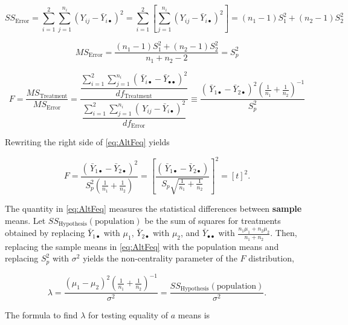 \documentclass[
]{article}
\begin{document}
\begin{equation}
SS_\text{Error} = \sum_{i=1}^{2}\sum_{j=1}^{n_i}(Y_{ij} - \bar{Y}_{i\bullet})^2 = \sum_{i=1}^{2}\left[\sum_{j=1}^{n_i}(Y_{ij}- \bar{Y}_{i\bullet})^2\right] = (n_1 - 1)S_1^2 + (n_2 - 1)S_2^2
\label{eq:FE}
\end{equation}

\begin{equation}
MS_\text{Error} = \frac{(n_1 - 1)S_1^2 + (n_2 - 1)S_2^2}{n_1 + n_2 -2} = S_p^2
\label{eq:MFE}
\end{equation}

\begin{equation}
F = \frac{MS_\text{Treatment}}{MS_\text{Error}} = \dfrac{\dfrac{\sum_{i=1}^2 \sum_{j=1}^{n_i} (\,\bar{Y}_{i\bullet} - \bar{Y}_{\bullet\bullet})^2}{df_\text{Treatment}}}{\dfrac{\sum_{i=1}^2 \sum_{j=1}^{n_i}(\, Y_{ij}- \bar{Y}_{i\bullet})^2}{ df_\text{Error}}} \equiv \dfrac{(\,\bar{Y}_{1\bullet} -\bar{Y}_{2\bullet})^2 \left( \frac{1}{n_1} + \frac{1}{n_2} \right)^{-1}}{S^2_p}
\label{eq:AltFeq}
\end{equation}

Rewriting the right side of \eqref{eq:AltFeq} yields

\begin{equation}
F = \dfrac{(\,\bar{Y}_{1\bullet} -\bar{Y}_{2\bullet})^2 }{S^2_p\left( \frac{1}{n_1} + \frac{1}{n_2} \right)} = \left[ \dfrac{(\,\bar{Y}_{1\bullet} -\bar{Y}_{2\bullet}) }{S_p \sqrt{ \frac{1}{n_1} + \frac{1}{n_2}}} \right]^2 = [t]^2.
\label{eq:tsqEQ}
\end{equation}

The quantity in \eqref{eq:AltFeq} measures the statistical differences between \textbf{sample} means. Let \(SS_\text{Hypothesis}(\text{population})\) be the sum of squares for treatments obtained by replacing \(\bar{Y}_{1\bullet}\) with \(\mu_1\), \(\bar{Y}_{2\bullet}\) with \(\mu_2\), and \(\bar{Y}_{\bullet\bullet}\) with \(\frac{n_1\mu_1+n_2\mu_2}{n_1+n_2}\). Then, replacing the sample means in \eqref{eq:AltFeq} with the population means and replacing \(S_p^2\) with \(\sigma^2\) yields the non-centrality parameter of the \(F\) distribution,

\begin{equation*}
\lambda =  \frac{ ( \mu_1 - \mu_2 )^2\left( \frac{1}{n_1} + \frac{1}{n_2} \right)^{-1} }{\sigma^2} = \frac{SS_\text{Hypothesis}(\text{population})}{\sigma^2}.
\end{equation*}

The formula to find \(\lambda\) for testing equality of \(a\) means is
\end{document}
